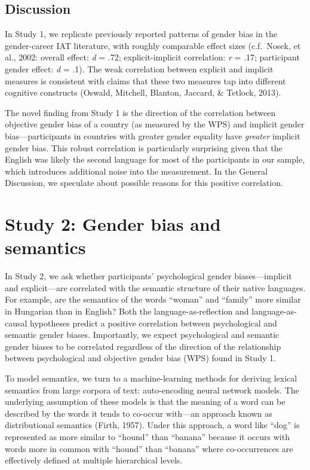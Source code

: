\documentclass[10pt, letterpaper]{article}
\begin{document}
\subsection{Discussion}\label{discussion}

In Study 1, we replicate previously reported patterns of gender bias in
the gender-career IAT literature, with roughly comparable effect sizes
(c.f.~Nosek, et al., 2002: overall effect: \emph{d} = .72;
explicit-implicit correlation: \emph{r} = .17; participant gender
effect: \emph{d} = .1). The weak correlation between explicit and
implicit measures is consistent with claims that these two measures tap
into different cognitive constructs (Oswald, Mitchell, Blanton, Jaccard,
\& Tetlock, 2013).

The novel finding from Study 1 is the direction of the correlation
between objective gender bias of a country (as measured by the WPS) and
implicit gender bias---participants in countries with greater gender
equality have \emph{greater} implicit gender bias. This robust
correlation is particularly surprising given that the English was likely
the second language for most of the participants in our sample, which
introduces additional noise into the measurement. In the General
Discussion, we speculate about possible reasons for this positive
correlation.

\section{Study 2: Gender bias and
semantics}\label{study-2-gender-bias-and-semantics}

In Study 2, we ask whether participants' psychological gender
biases---implicit and explicit---are correlated with the semantic
structure of their native languages. For example, are the semantics of
the words ``woman'' and ``family'' more similar in Hungarian than in
English? Both the language-as-reflection and language-as-causal
hypotheses predict a positive correlation between psychological and
semantic gender biases. Importantly, we expect psychological and
semantic gender biases to be correlated regardless of the direction of
the relationship between psychological and objective gender bias (WPS)
found in Study 1.

To model semantics, we turn to a machine-learning methods for deriving
lexical semantics from large corpora of text: auto-encoding neural
network models. The underlying assumption of these models is that the
meaning of a word can be described by the words it tends to co-occur
with---an approach known as distributional semantics (Firth, 1957).
Under this approach, a word like ``dog'' is represented as more similar
to ``hound'' than ``banana'' because it occurs with words more in common
with ``hound'' than ``banana'' where co-occurrences are effectively
defined at multiple hierarchical levels.
\end{document}
